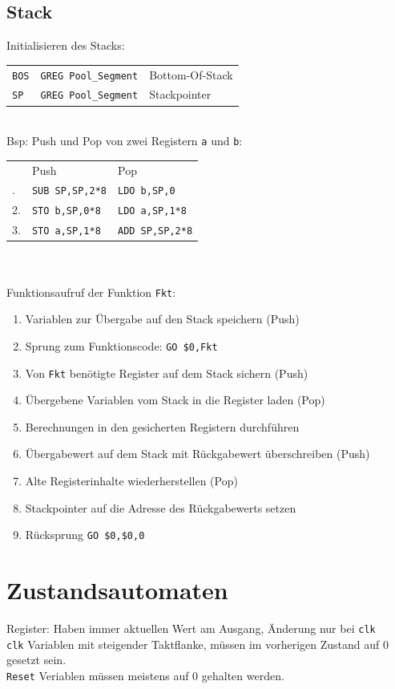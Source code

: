 \documentclass[fs]{latex4ei}
\begin{document}
\begin{multicols}{4}
		\subsection{Stack}
		Initialisieren des Stacks:\\
		\begin{tabular}{lll}
			\texttt{BOS} & \texttt{GREG Pool\_Segment} & Bottom-Of-Stack \\
			\texttt{SP} & \texttt{GREG Pool\_Segment} & Stackpointer \\
		\end{tabular}\\
		Bsp: Push und Pop von zwei Registern {\tt a} und {\tt b}:\\
		\begin{tabular}{l|l|l}
			& Push & Pop \\ \mrule
		1. 	& \texttt{SUB SP,SP,2*8} & \texttt{LDO b,SP,0}\\
		2.	& \texttt{STO b,SP,0*8} & \texttt{LDO a,SP,1*8}\\
		3.	& \texttt{STO a,SP,1*8} & \texttt{ADD SP,SP,2*8}\\
		\end{tabular}\\
		\\
		Funktionsaufruf der Funktion \texttt{Fkt}: 
		\begin{enumerate}\itemsep0pt
			\item Variablen zur Übergabe auf den Stack speichern (Push)
			\item Sprung zum Funktionscode: \texttt{GO \$0,Fkt}
			\item Von \texttt{Fkt} benötigte Register auf dem Stack sichern (Push)
			\item Übergebene Variablen vom Stack in die Register laden (Pop)
			\item Berechnungen in den gesicherten Registern durchführen
			\item Übergabewert auf dem Stack mit Rückgabewert überschreiben (Push)
			\item Alte Registerinhalte wiederherstellen (Pop)
			\item Stackpointer auf die Adresse des Rückgabewerts setzen 
			\item Rücksprung \texttt{GO \$0,\$0,0}
		\end{enumerate}

\section{Zustandsautomaten}
Register: Haben immer aktuellen Wert am Ausgang, Änderung nur bei \texttt{clk}\\
\texttt{clk} Variablen mit steigender Taktflanke, müssen im vorherigen Zustand auf 0 gesetzt sein.\\
\texttt{Reset} Veriablen müssen meistens auf 0 gehalten werden.\\
 

\end{multicols}
\end{document}
